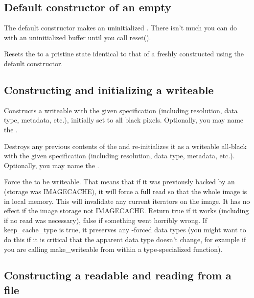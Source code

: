 \subsection*{Default constructor of an empty \ImageBuf}

The default constructor makes an uninitialized \ImageBuf.  There isn't
much you can do with an uninitialized buffer until you call {\cf reset()}.
\apiend

Resets the \ImageBuf to a pristine state identical to that of a freshly
constructed \ImageBuf using the default constructor.
\apiend


\subsection*{Constructing and initializing a writeable \ImageBuf}

Constructs a writeable \ImageBuf with the given specification (including
resolution, data type, metadata, etc.), initially set to all black pixels.
Optionally, you may name the \ImageBuf.
\apiend

Destroys any previous contents of the \ImageBuf and re-initializes it
as a writeable all-black \ImageBuf with the given specification (including
resolution, data type, metadata, etc.).  Optionally, you may name the
\ImageBuf.
\apiend

Force the \ImageBuf to be writeable. That means that if it was previously
backed by an \ImageCache (storage was {\cf IMAGECACHE}), it will force a
full read so that the whole image is in local memory.
This will invalidate any current iterators on the image. It has
no effect if the image storage not {\cf IMAGECACHE}.  Return {\cf true} if
it works (including if no read was necessary), {\cf false} if something went
horribly wrong. If {\cf keep_cache_type} is true, it preserves any
\ImageCache-forced data types (you might want to do this if it is critical
that the apparent data type doesn't change, for example if you are calling
make_writeable from within a type-specialized function).
\apiend

\subsection*{Constructing a readable \ImageBuf and reading from a file}

